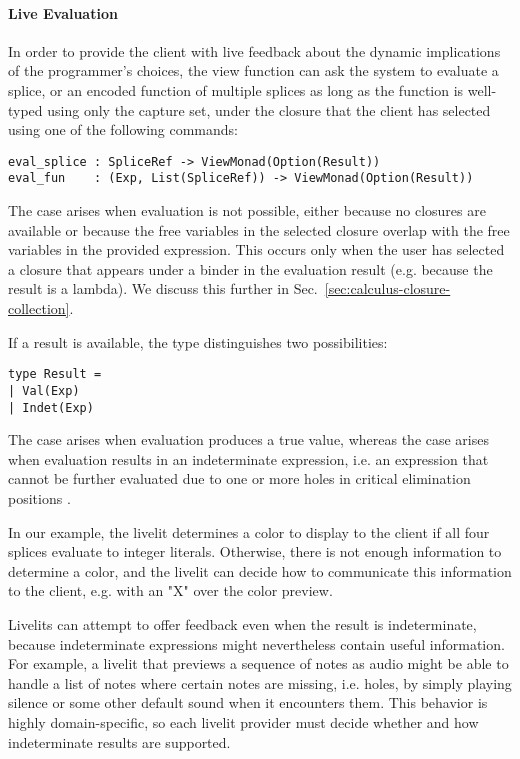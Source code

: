 \paragraph{Live Evaluation}
\label{sec:live-evaluation-def}
In order to provide the client with live feedback about the dynamic implications 
of the programmer's choices, 
the view function can ask the system to evaluate a splice, or an encoded function of 
multiple splices as long as the function is well-typed using only the capture set, 
under the closure that the client has selected using one of the following
commands:
\begin{lstlisting}[numbers=none]
eval_splice : SpliceRef -> ViewMonad(Option(Result))
eval_fun    : (Exp, List(SpliceRef)) -> ViewMonad(Option(Result))
\end{lstlisting}

The  case 
arises when evaluation is not possible, either because no closures are available
or because the free variables in the selected closure overlap with the free 
variables in the provided expression. This occurs only when the user has selected
a closure that appears under a binder in the evaluation result (e.g. because 
the result is a lambda). 
We discuss this further in Sec.~\ref{sec:calculus-closure-collection}.

If a result is available, the  type distinguishes two possibilities:
\begin{lstlisting}[numbers=none]
type Result = 
| Val(Exp)
| Indet(Exp)
\end{lstlisting}
The  case arises when evaluation produces a true value, whereas the 
 case arises when evaluation results in an indeterminate expression,
i.e. an expression that cannot be further evaluated due to one or more holes 
in critical elimination positions \cite{HazelnutLive}.

In our example, the livelit determines a color to display to the client 
if all four splices evaluate to integer literals. Otherwise, there is not 
enough information to determine a color, and the livelit can decide how to 
communicate this information to the client, e.g. with an "X" over the color 
preview.

Livelits can attempt to offer feedback even when the result is indeterminate,
because indeterminate expressions might nevertheless contain useful information.
For example, a livelit that previews a sequence of notes as audio might be able 
to handle a list of notes where certain notes are missing, i.e. holes, by 
simply playing silence or some other default sound when it encounters them.
This behavior is highly domain-specific, so each livelit provider must decide 
whether and how indeterminate results are supported.

